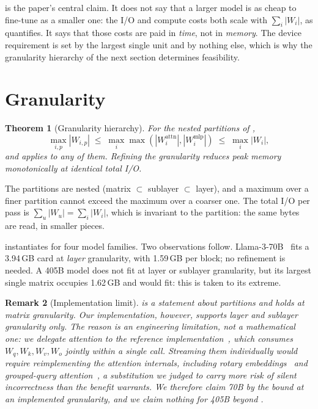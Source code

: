 \documentclass[journal]{IEEEtran}
\newtheorem{theorem}{Theorem}
\newtheorem{remark}[theorem]{Remark}
\newcommand{\Wu}{\lvert W_u \rvert}
\begin{document}
 is the paper's central claim. It does not say that a larger model is as cheap to
fine-tune as a smaller one: the I/O and
compute costs both scale with $\sum_i |W_i|$, as  quantifies. It says that those
costs are paid in \emph{time}, not in \emph{memory}. The device requirement is set by the largest
single unit and by nothing else, which is why the granularity hierarchy of the next section
determines feasibility.

\section{Granularity}
\label{sec:gran}

\begin{theorem}[Granularity hierarchy]
\label{thm:gran}
For the nested partitions of ,
\begin{equation}
\max_{i,p} |W_{i,p}| \;\le\; \max_i \max\!\left(|W_i^{\text{attn}}|, |W_i^{\text{mlp}}|\right)
\;\le\; \max_i |W_i| ,
\end{equation}
and  applies to any of them. Refining the granularity reduces peak memory
monotonically at identical total I/O.
\end{theorem}

\begin{IEEEproof}
The partitions are nested (matrix $\subset$ sublayer $\subset$ layer), and a maximum over a finer
partition cannot exceed the maximum over a coarser one. The total I/O per pass is
$\sum_u \Wu = \sum_i |W_i|$, which is invariant to the partition: the same bytes are read, in
smaller pieces.
\end{IEEEproof}

 instantiates  for four model families. Two observations follow.
Llama-3-70B~\cite{grattafiori2024llama3} fits a 3.94\,GB card at \emph{layer} granularity, with
1.59\,GB per block; no refinement is needed. A 405B model does not fit at layer or sublayer
granularity, but its largest single matrix occupies 1.62\,GB and would fit: this is 
taken to its extreme.

\begin{remark}[Implementation limit]
\label{rem:matrixlimit}
 is a statement about partitions and holds at matrix granularity. Our
\emph{implementation}, however, supports layer and sublayer granularity only. The reason is
an engineering limitation, not a mathematical one: we delegate attention to the reference
implementation~\cite{wolf2020transformers}, which consumes $W_q, W_k, W_v, W_o$ jointly within a
single call. Streaming them individually would require reimplementing the attention internals,
including rotary embeddings~\cite{su2024roformer} and grouped-query
attention~\cite{shazeer2019mqa}, a substitution we judged to carry more risk of silent
incorrectness than the benefit warrants. We therefore claim 70B by the bound at an implemented
granularity, and we claim nothing for 405B beyond .
\end{remark}
\end{document}
